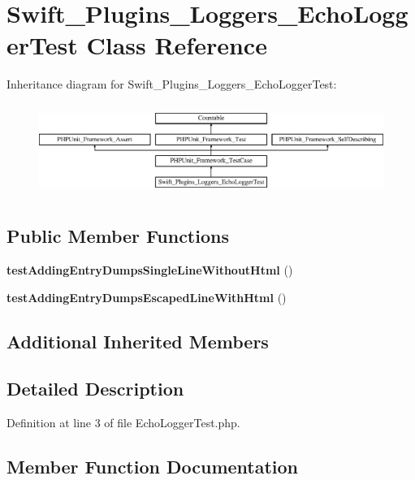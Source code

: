 \section{Swift\+\_\+\+Plugins\+\_\+\+Loggers\+\_\+\+Echo\+Logger\+Test Class Reference}
\label{class_swift___plugins___loggers___echo_logger_test}
Inheritance diagram for Swift\+\_\+\+Plugins\+\_\+\+Loggers\+\_\+\+Echo\+Logger\+Test\+:\begin{figure}[H]
\begin{center}
\leavevmode
\includegraphics[height=3.022942cm]{class_swift___plugins___loggers___echo_logger_test}
\end{center}
\end{figure}
\subsection*{Public Member Functions}
\begin{DoxyCompactItemize}
\item 
{\bf test\+Adding\+Entry\+Dumps\+Single\+Line\+Without\+Html} ()
\item 
{\bf test\+Adding\+Entry\+Dumps\+Escaped\+Line\+With\+Html} ()
\end{DoxyCompactItemize}
\subsection*{Additional Inherited Members}


\subsection{Detailed Description}


Definition at line 3 of file Echo\+Logger\+Test.\+php.



\subsection{Member Function Documentation}
